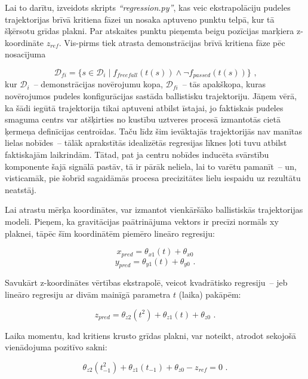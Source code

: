 \documentclass[12pt, a4paper]{article}
\numberwithin{equation}{section} %
\begin{document}
Lai to darītu, izveidots skripts \textit{``regression.py''}, kas veic ekstrapolāciju pudeles trajektorijas brīvā kritiena fāzei un nosaka aptuveno punktu telpā, kur tā šķērsotu grīdas plakni. Par atskaites punktu pieņemta beigu pozīcijas marķiera z-koordināte $z_{ref}$. Vis-pirms tiek atrasta demonstrācijas brīvā kritiena fāze pēc nosacījuma


\begin{equation}
    \mathcal{D}_{fi} = \lbrace s \in \mathcal{D}_i \mid f_{freefall}(t(s)) \land \lnot f_{passed}(t(s)) \rbrace
\text{ ,}
\end{equation}
kur $\mathcal{D}_i$~-- demonstrācijas novērojumu kopa, $\mathcal{D}_{fi}$~-- tās apakškopa, kuras novērojumos pudeles konfigurācijas sastāda ballistisku trajektoriju. Jāņem vērā, ka šādi iegūtā trajektorija tikai aptuveni atbilst īstajai, jo faktiskais pudeles smaguma centrs var atšķirties no kustību uztveres procesā izmantotās cietā ķermeņa definīcijas centroīdas. Taču līdz šim ievāktajās trajektorijās nav manītas lielas nobīdes~-- tālāk aprakstītās idealizētās regresijas līknes ļoti tuvu atbilst faktiskajām laikrindām. Tātad, pat ja centru nobīdes inducēta svārstību komponente šajā signālā pastāv, tā ir pārāk neliela, lai to varētu pamanīt~-- un, visticamāk, pie šobrīd sagaidāmās procesa precizitātes lielu iespaidu uz rezultātu neatstāj.

Lai atrastu mērķa koordinātes, var izmantot vienkāršāko ballistiskās trajektorijas modeli. Pieņem, ka gravitācijas paātrinājuma vektors ir precīzi normāls xy plaknei, tāpēc šīm koordinātēm piemēro lineāro regresiju:


\begin{equation}
    x_{pred} = \theta_{x1}(t) + \theta_{x0}
\end{equation}
\begin{equation}
    y_{pred} = \theta_{y1}(t) + \theta_{y0}
\text{ .}
\end{equation}

Savukārt z-koordinātes vērtības ekstrapolē, veicot kvadrātisko regresiju~-- jeb lineāro regresiju ar divām mainīgā parametra $t$ (laika) pakāpēm:

\begin{equation}
    z_{pred} = \theta_{z2}(t^2) + \theta_{z1}(t) + \theta_{z0}
\text{ .}
\end{equation}

Laika momentu, kad kritiens krusto grīdas plakni, var noteikt,  atrodot sekojošā vienādojuma pozitīvo sakni:

\begin{equation}
    \theta_{z2}(t_{-1}^2) + \theta_{z1}(t_{-1}) + \theta_{z0} - z_{ref} = 0
\text{ .}
\end{equation}
\end{document}

